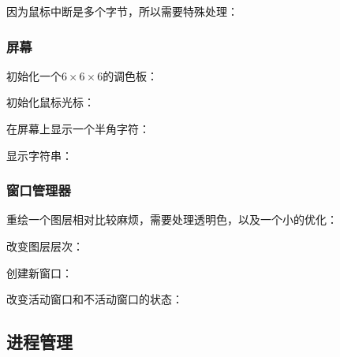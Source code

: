 因为鼠标中断是多个字节，所以需要特殊处理：
{\linespread{1}}

\subsubsection{屏幕}
\label{subs:屏幕}

初始化一个$6\times6\times6$的调色板：
{\linespread{1}}

初始化鼠标光标：
{\linespread{1}}

在屏幕上显示一个半角字符：
{\linespread{1}}

显示字符串：
{\linespread{1}}

\subsubsection{窗口管理器}
\label{subs:窗口管理器}

{\linespread{1}}
{\linespread{1}}

重绘一个图层相对比较麻烦，需要处理透明色，以及一个小的优化：
{\linespread{1}}

改变图层层次：
{\linespread{1}}

创建新窗口：
{\linespread{1}}

改变活动窗口和不活动窗口的状态：
{\linespread{1}}

\subsection{进程管理}
\label{sub:进程管理}

{\linespread{1}}
{\linespread{1}}
{\linespread{1}}
{\linespread{1}}
{\linespread{1}}
{\linespread{1}}
{\linespread{1}}

